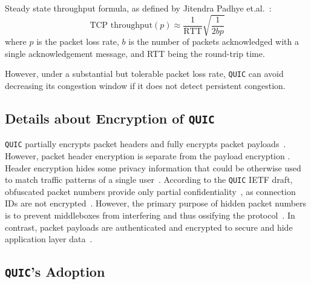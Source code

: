 \documentclass[12pt,a4paper]{report}
\newcommand\note[2]{{\color{#1}\bf #2}}
\newcommand\simon[1]{\ifcomments{\note{cyan}{SM: #1}}\fi}
\begin{document}
\begin{itemize}
  Steady state throughput formula, as defined by Jitendra Padhye et.al.~\cite{TCP_throughput_formula}: 
    \begin{equation}
    \textrm{TCP throughput} (p) \approx \frac{1}{\textrm{RTT}}\sqrt{\frac{1}{2bp}} 
    \label{eq:gass_stuff}
    \end{equation}
     where $p$ is the packet loss rate, $b$ is the number of packets acknowledged with a single acknowledgement message, and RTT being the round-trip time.
  
  
  However, under a substantial but tolerable packet loss rate, \texttt{QUIC} can avoid decreasing its congestion window if it does not detect persistent congestion.
  
  
\end{itemize}



\subsection{Details about Encryption of \texttt{QUIC}} \label{subsection_QUIC_header_format}


\texttt{QUIC} partially encrypts packet headers and fully encrypts packet payloads~\cite{the-road-to-quic}.
However, packet header encryption is separate from the payload encryption
\simon{TODO: FIND SOURCE}.
Header encryption hides some privacy information that could be otherwise used to match traffic patterns of a single user~\cite{2017-12-18-transport-header-encryption, the-road-to-quic}.
According to the \texttt{QUIC} IETF draft, obfuscated packet numbers provide only partial confidentiality~\cite{ietf-quic-transport-draft-32}, as connection IDs are not encrypted~\cite[Section~5.4.1]{ietf-quic-tls-32}.
However, the primary purpose of hidden packet numbers is to prevent middleboxes from interfering and thus ossifying the protocol~\cite{the-road-to-quic}.
In contrast, packet payloads are authenticated and encrypted to secure and hide application layer data~\cite{ietf-quic-tls-32}.

  
  
\subsection{\texttt{QUIC}'s Adoption}
\end{document}
